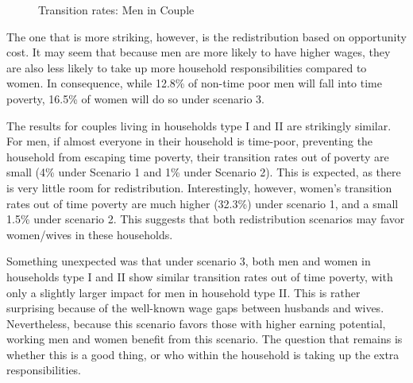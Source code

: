 \documentclass[
  11pt,
]{article}
\begin{document}
\begin{figure}[H]


\caption{\label{fig-transition1}Transition rates: Men in Couple}

\end{figure}%

The one that is more striking, however, is the redistribution based on
opportunity cost. It may seem that because men are more likely to have
higher wages, they are also less likely to take up more household
responsibilities compared to women. In consequence, while 12.8\% of
non-time poor men will fall into time poverty, 16.5\% of women will do
so under scenario 3.

The results for couples living in households type I and II are
strikingly similar. For men, if almost everyone in their household is
time-poor, preventing the household from escaping time poverty, their
transition rates out of poverty are small (4\% under Scenario 1 and 1\%
under Scenario 2). This is expected, as there is very little room for
redistribution. Interestingly, however, women's transition rates out of
time poverty are much higher (32.3\%) under scenario 1, and a small
1.5\% under scenario 2. This suggests that both redistribution scenarios
may favor women/wives in these households.

Something unexpected was that under scenario 3, both men and women in
households type I and II show similar transition rates out of time
poverty, with only a slightly larger impact for men in household type
II. This is rather surprising because of the well-known wage gaps
between husbands and wives. Nevertheless, because this scenario favors
those with higher earning potential, working men and women benefit from
this scenario. The question that remains is whether this is a good
thing, or who within the household is taking up the extra
responsibilities.
\end{document}
